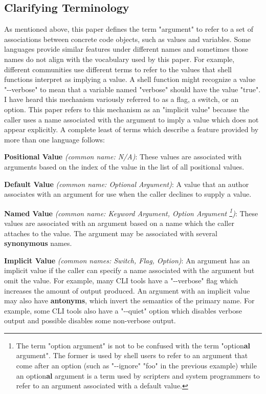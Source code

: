 \subsection{Clarifying Terminology}

As mentioned above, this paper defines the term "argument" to refer to a set of
associations between concrete code objects, such as values and variables.
Some languages provide similar features under different names and sometimes those names
do not align with the vocabulary used by this paper.
For example, different communities use different terms to refer to the values that shell
functions interpret as implying a value.
A shell function might recognize a value "-{}-verbose" to mean that a variable named
"verbose" should have the value "true".
I have heard this mechanism variously referred to as a flag, a switch, or an option.
This paper refers to this mechanism as an "implicit value" because the caller uses a name
associated with the argument to imply a value which does not appear explicitly.
A complete least of terms which describe a feature provided by more than one language
follows:

\textbf{Positional Value} \textit{(common name: N/A)}:
These values are associated with arguments based on the index of the value in the list of
all positional values.

\textbf{Default Value} \textit{(common name: Optional Argument)}:
A value that an author associates with an argument for use when
the caller declines to supply a value.

\textbf{Named Value} \textit{(common name: Keyword Argument, Option Argument
\footnote{
	The term "option argument" is not to be confused with the term "option\textbf{al}
	argument".
	The former is used by shell users to refer to an argument that come after an option
	(such as "-{}-ignore" "foo" in the previous example) while an option\textbf{al} argument
	is a term used by scripters and system programmers to refer to an argument associated
	with a default value.
})}:
These values are associated with an argument based on a name which the caller attaches to
the value.
The argument may be associated with several \textbf{synonymous} names.

\textbf{Implicit Value} \textit{(common names: Switch, Flag, Option)}:
An argument has an implicit value if the caller can specify a name associated with the
argument but omit the value.
For example, many CLI tools have a "-{}-verbose" flag which increases the amount of output
produced.
An argument with an implicit value may also have \textbf{antonyms}, which invert the
semantics of the primary name.
For example, some CLI tools also have a "-{}-quiet" option which disables verbose output
and possible disables some non-verbose output.

